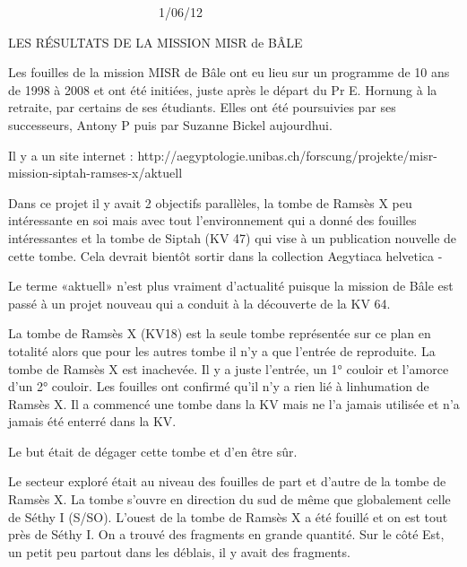 \documentclass{article}
\title{}
\begin{document}
 \ \ \ \ \ \ \ \ \ \ \ \ \ \ \ \ \ \ \ \ \ \   \ \   1/06/12

LES RÉSULTATS DE LA MISSION MISR de BÂLE

Les fouilles de la mission MISR de Bâle ont eu lieu sur un programme de
10 ans de 1998 à 2008 et ont été initiées,  juste après le départ du Pr
E. Hornung à la retraite, par certains de ses étudiants. Elles ont été
poursuivies par ses successeurs, Antony P puis par Suzanne Bickel
aujourd{\textquotesingle}hui. 

Il y a un site internet :
http://aegyptologie.unibas.ch/forscung/projekte/misr-mission-siptah-ramses-x/aktuell

Dans ce projet il y avait 2 objectifs parallèles, la tombe de Ramsès X
peu intéressante en soi mais avec tout l’environnement qui a donné des
fouilles intéressantes et la tombe de Siptah (KV 47) qui vise à un
publication nouvelle de cette tombe. Cela devrait bientôt sortir dans
la collection Aegytiaca helvetica -

Le terme «aktuell» n’est plus vraiment d’actualité puisque la mission de
Bâle est passé à un projet nouveau qui a conduit à la découverte de la
KV 64.

 La tombe de Ramsès X (KV18) est la seule tombe représentée sur ce plan
en totalité alors que pour les autres tombe il n’y a que l’entrée de
reproduite. La tombe de Ramsès X est inachevée. Il y a juste l’entrée,
un 1° couloir et l’amorce d’un 2° couloir. Les fouilles ont confirmé
qu’il n’y a rien lié à l{\textquotesingle}inhumation de Ramsès X. Il a
commencé une tombe dans la KV mais ne l’a jamais utilisée et n’a jamais
été enterré dans la KV. 

\begin{figure}[htp]

\end{figure}
\begin{figure}[htp]

\end{figure}
Le but était de dégager cette tombe et d’en être sûr. 

Le secteur exploré était au niveau des fouilles de part et d’autre de la
tombe de Ramsès X. La tombe s’ouvre en direction du sud de même que
globalement celle de Séthy I (S/SO). L’ouest de la tombe de Ramsès X a
été fouillé et on est tout près de Séthy I. On a trouvé des fragments
en grande quantité. Sur le côté Est, un petit peu partout dans les
déblais,  il y avait des fragments.  
\end{document}
